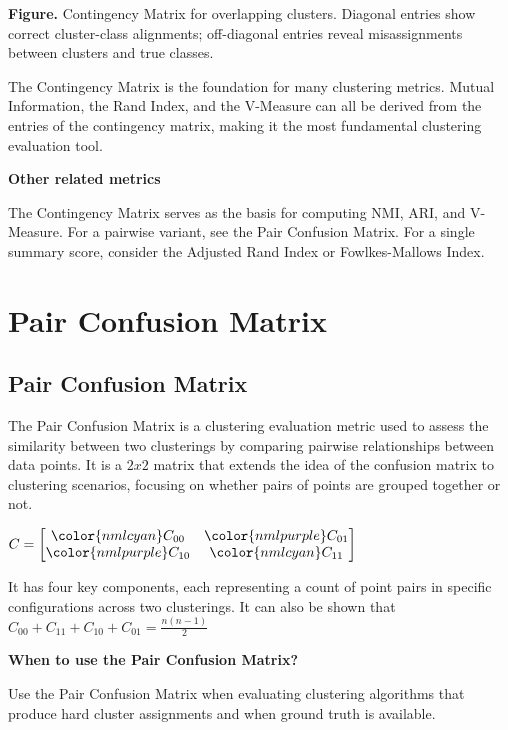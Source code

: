 \textbf{Figure.} Contingency Matrix for overlapping clusters. Diagonal entries show correct cluster-class alignments; off-diagonal entries reveal misassignments between clusters and true classes.

{The Contingency Matrix is the foundation for many clustering metrics. Mutual Information, the Rand Index, and the V-Measure can all be derived
from the entries of the contingency matrix, making it the most fundamental clustering evaluation tool.}

\textbf{Other related metrics}

The Contingency Matrix serves as the basis for computing NMI, ARI, and V-Measure. For a pairwise variant, see the Pair Confusion Matrix.
For a single summary score, consider the Adjusted Rand Index or Fowlkes-Mallows Index.

\clearpage
\thispagestyle{clusteringstyle}
\section{Pair Confusion Matrix}
\subsection{Pair Confusion Matrix}

The Pair Confusion Matrix is a clustering evaluation metric used to assess the similarity between two clusterings by
comparing pairwise relationships between data points. It is a $2x2$ matrix that extends the idea of the confusion matrix
to clustering scenarios, focusing on whether pairs of points are grouped together or not.

\begin{center}
    $\displaystyle
    C = \begin{bmatrix}
        {\color{nmlcyan}C_{00}} & {\color{nmlpurple}C_{01}} \\
        {\color{nmlpurple}C_{10}} & {\color{nmlcyan}C_{11}}
    \end{bmatrix}
    $
\end{center}

It has four key components, each representing a count of point pairs in specific configurations across two clusterings. It can
also be shown that $C_{00} + C_{11} + C_{10} + C_{01} = \frac{n(n-1)}{2}$

\textbf{When to use the Pair Confusion Matrix?}

Use the Pair Confusion Matrix when evaluating clustering algorithms that produce hard cluster assignments and when ground truth
is available.

